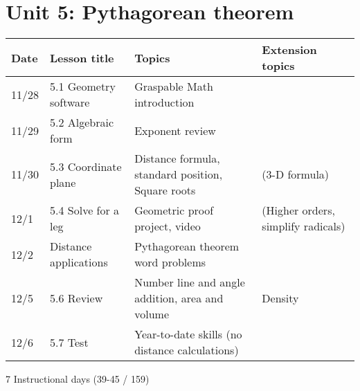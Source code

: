 \section*{Unit 5: Pythagorean theorem}
\begin{tabular}{|p{0.9cm}|p{4cm}|p{7cm}|p{5cm}|}
  \hline
  Date & Lesson title & Topics  & Extension topics \\
  \hline
  11/28 & 5.1 Geometry software & Graspable Math introduction &  \\
  \hline %
  11/29 & 5.2 Algebraic form & Exponent review &  \\
  \hline %
  11/30 & 5.3 Coordinate plane & Distance formula, standard position, Square roots & (3-D formula) \\
  \hline
  12/1 & 5.4 Solve for a leg & Geometric proof project, video & (Higher orders, simplify radicals) \\
  \hline %
  12/2 & Distance applications & Pythagorean theorem word problems &  \\
  \hline
  12/5 & 5.6 Review & Number line and angle addition, area and volume & Density \\
  \hline
  12/6 & 5.7 Test & Year-to-date skills (no distance calculations) & \\
  \hline %

\end{tabular} \par \vspace*{0.3cm}
7 Instructional days (39-45 / 159)


